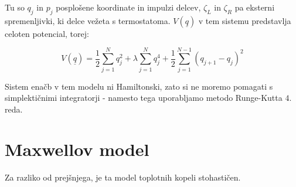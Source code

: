 \documentclass[a4paper]{article}
\newcommand{\half}{\frac{1}{2}}
\newcommand{\q}{\underline{q}}
\begin{document}
    Tu so $q_j$ in $p_j$ posplošene koordinate in impulzi delcev, $\zeta_L$ in $\zeta_R$ pa eksterni spremenljivki, ki
    delce vežeta s termostatoma. $V(\q)$ v tem sistemu predstavlja celoten potencial, torej:

    \begin{equation}\label{eq4}
        V(\q) = \half \sum_{j=1}^N q_j^2 + \lambda \sum_{j=1}^N q_j^4 + \half \sum_{j=1}^{N-1} (q_{j+1} - q_j)^2
    \end{equation}

    Sistem enačb v tem modelu ni Hamiltonski, zato si ne moremo pomagati s simplektičnimi integratorji - namesto tega
    uporabljamo metodo Runge-Kutta $4.$ reda.

    \section{Maxwellov model}

    Za razliko od prejšnjega, je ta model toplotnih kopeli stohastičen.

    \iffalse
    \begin{figure}
        \centering
        \texttt{[image: slika1.pdf]}
        \caption{Avtokorelacijska funkcija spinskega toka.}
        \label{slika1}
    \end{figure}
    \fi
\end{document}
